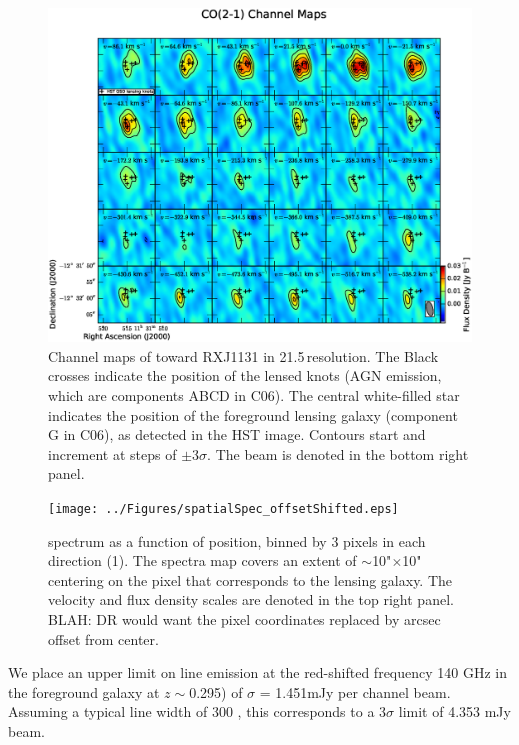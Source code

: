 \documentclass[]{emulateapj}
\begin{document}
\begin{figure}[tbph]
\centering
\includegraphics[width=1.0\textwidth]{../Figures/co_channel_maps.eps}
\caption{
Channel maps of \pdbi \bco toward RXJ1131 in 21.5\,\kms resolution. The
Black crosses indicate the position of the lensed knots (AGN emission,
which are components ABCD in C06). The central white-filled
star indicates the position of the foreground lensing galaxy (component G
in C06), as detected in the HST image. Contours start and increment at steps of
$\pm$3$\sigma$. The beam is denoted in the bottom right panel. \label{fig:chanmap}}
\end{figure}

\begin{figure}[tbph]
\centering
\texttt{[image: ../Figures/spatialSpec\_offsetShifted.eps]}
\caption{
\bco spectrum as a function of position, binned by 3 pixels in each
direction (1). The spectra map covers an extent of $\sim$10"$\times$10"
centering on the pixel that corresponds to the lensing galaxy. The velocity
and flux density scales are denoted in the top right panel.
BLAH: DR would want the pixel coordinates replaced by arcsec offset from
center. \label{fig:spatialSpec}}
\end{figure}

We place an upper limit on  line emission at the red-shifted
frequency 140 GHz in the foreground galaxy at $z\sim$0.295) of
$\sigma$ = 1.451mJy per channel beam\pmOne.
Assuming a typical line width of 300 \kms, this corresponds to a 3$\sigma$
limit of 4.353 mJy \kms beam\pmOne.
\end{document}
